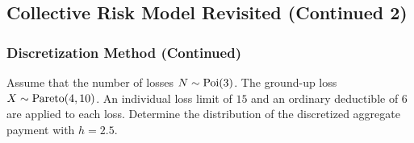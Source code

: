 \documentclass[notoc,notitlepage]{tufte-book}
\begin{document}
\subsection{Collective Risk Model Revisited (Continued 2)}%
\label{sub:collective_risk_model_revisited_continued_2}

\subsubsection{Discretization Method (Continued)}%
\label{ssub:discretization_method_continued}

\begin{eg}
  Assume that the number of losses $N \sim \operatorname{Poi}(3)$. The ground-up loss $X \sim \operatorname{Pareto}(4, 10)$. An individual loss limit of $15$ and an ordinary deductible of $6$ are applied to each loss. Determine the distribution of the discretized aggregate payment with $h = 2.5$.
\end{eg}
\end{document}
